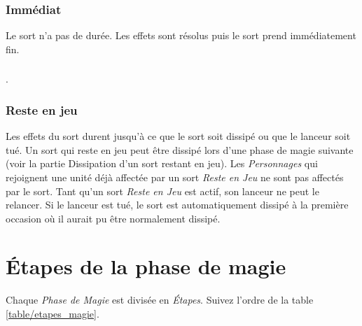 \subsubsection*{Immédiat}

Le sort n'a pas de durée. Les effets sont résolus puis le sort prend immédiatement fin.

\subsubsection*{}

.

\subsubsection*{Reste en jeu}

Les effets du sort durent jusqu'à ce que le sort soit dissipé ou que le lanceur soit tué. Un sort qui reste en jeu peut être dissipé lors d'une phase de magie suivante (voir la partie Dissipation d'un sort restant en jeu).  Les \emph{Personnages} qui rejoignent une unité déjà affectée par un sort \emph{Reste en Jeu} ne sont pas affectés par le sort. Tant qu'un sort \emph{Reste en Jeu} est actif, son lanceur ne peut le relancer. Si le lanceur est tué, le sort est automatiquement dissipé à la première occasion où il aurait pu être normalement dissipé.

\section{Étapes de la phase de magie}
\label{etapes_phase_magie}

Chaque \emph{Phase de Magie} est divisée en \emph{Étapes}. Suivez l'ordre de la table \ref{table/etapes_magie}.

